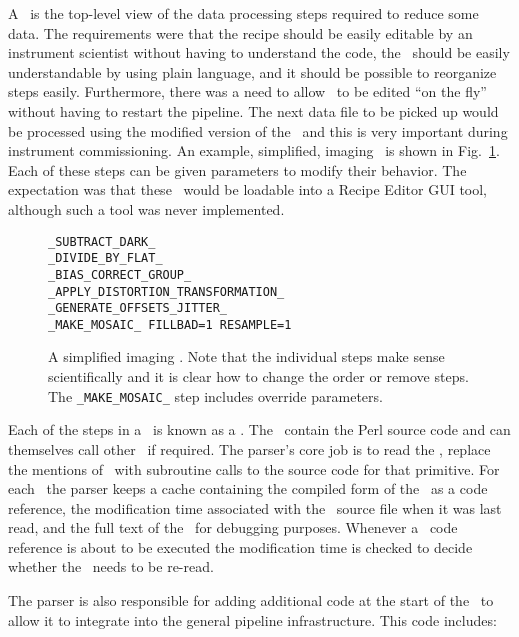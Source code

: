 \documentclass[final,authoryear,5p,times,twocolumn]{elsarticle}
\begin{document}
A \recipe\ is the top-level view of the data processing steps
required to reduce some data. The requirements were that the recipe
should be easily editable by an instrument scientist without having to
understand the code, the \recipe\ should be easily understandable by
using plain language, and it should be possible to reorganize steps
easily. Furthermore, there was a need to allow \recipes\ to be edited
``on the fly'' without having to restart the pipeline. The next data file
to be picked up would be processed using the modified version of the
\recipe\ and this is very important during instrument commissioning. An
example, simplified, imaging \recipe\ is shown in Fig.\
\ref{fig:recipe}. Each of these steps can be given parameters to
modify their behavior. The expectation was that these \recipes\ would
be loadable into a Recipe Editor GUI tool, although such a tool was
never implemented.

\begin{figure}
{
\small
\begin{verbatim}
_SUBTRACT_DARK_
_DIVIDE_BY_FLAT_
_BIAS_CORRECT_GROUP_
_APPLY_DISTORTION_TRANSFORMATION_
_GENERATE_OFFSETS_JITTER_
_MAKE_MOSAIC_ FILLBAD=1 RESAMPLE=1
\end{verbatim}
}
\caption{A simplified imaging \recipe. Note that the individual steps
  make sense scientifically and it is clear how to change the order or
  remove steps. The \texttt{\_MAKE\_MOSAIC\_} step includes override
  parameters.}
\label{fig:recipe}
\end{figure}

Each of the steps in a \recipe\ is known as a
\primitive. The \primitives\ contain the Perl source code and can
themselves call other \primitives\ if required.
The parser's core job is to read the \recipe, replace the mentions of \primitives\
with subroutine calls to the source code for that primitive. For each
\primitive\ the parser keeps a cache containing the compiled form of
the \primitive\ as a code reference, the modification time associated
with the \primitive\ source file when it was last read, and the full
text of the \primitive\ for debugging purposes. Whenever a \primitive\
code reference is about to be executed the modification time is
checked to decide whether the \primitive\ needs to be re-read.

The parser is also responsible for adding additional code at the
start of the \primitive\ to allow it to integrate into the general
pipeline infrastructure. This code includes:
\end{document}
